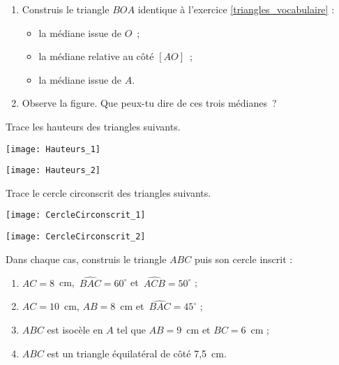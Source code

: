 \begin{exercice}[Médiane]
\begin{enumerate}
 \item Construis le triangle $BOA$ identique à l'exercice \ref{triangles_vocabulaire} :
 \begin{itemize}
  \item la médiane issue de $O$ ;
  \item la médiane relative au côté $[AO]$ ;
  \item la médiane issue de $A$.
  \end{itemize}
 \item Observe la figure. Que peux-tu dire de ces trois médianes ?
 \end{enumerate}
\end{exercice}


\begin{exercice}[Hauteurs]
Trace les hauteurs des triangles suivants.

\vspace{2em}
\begin{center}
 \texttt{[image: Hauteurs\_1]}
 
\vspace{1em}

 \texttt{[image: Hauteurs\_2]}
\end{center}
\vspace{1em}
\end{exercice}


\begin{exercice}
Trace le cercle circonscrit des triangles suivants.

\vspace{2em}
\begin{center}
 \texttt{[image: CercleCirconscrit\_1]}

\vspace{5em}
 \texttt{[image: CercleCirconscrit\_2]}
\end{center}
\vspace{2em}
\end{exercice}



\begin{exercice}
Dans chaque cas, construis le triangle $ABC$ puis son cercle inscrit :
\begin{enumerate}
 \item $AC = 8$ cm, $\widehat{BAC} = 60^\circ$ et $\widehat{ACB} = 50^\circ$ ;
 \item $AC = 10$ cm, $AB = 8$ cm et $\widehat{BAC} = 45^\circ$ ;
 \item $ABC$ est isocèle en $A$ tel que $AB = 9$ cm et $BC = 6$ cm ;
 \item $ABC$ est un triangle équilatéral de côté 7,5 cm.
 \end{enumerate}
\end{exercice}


